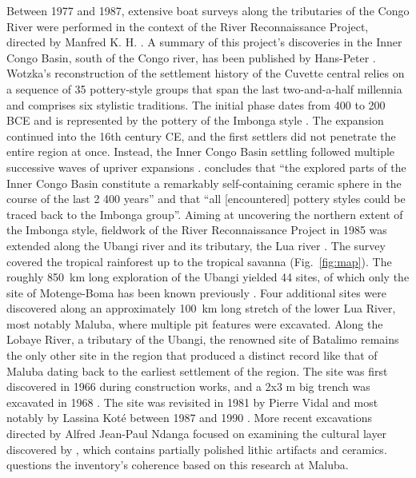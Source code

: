 \documentclass[smallextended,natbib]{svjour3}       %
\begin{document}
Between 1977 and 1987, extensive boat surveys along the tributaries of the Congo River were performed in the context of the River Reconnaissance Project, directed by Manfred K. H. \cite{Eggert.1983,Eggert.1984,Eggert.1993,Eggert.1996}. A summary of this project’s discoveries in the Inner Congo Basin, south of the Congo river, has been published by Hans-Peter \cite{Wotzka.1993}. Wotzka’s reconstruction of the settlement history of the Cuvette central relies on a sequence of 35 pottery-style groups that span the last two-and-a-half millennia and comprises six stylistic traditions. The initial phase dates from 400 to 200 BCE and is represented by the pottery of the Imbonga style \citep[59--68]{Wotzka.1995}. The expansion continued into the 16th century CE, and the first settlers did not penetrate the entire region at once. Instead, the Inner Congo Basin settling followed multiple successive waves of upriver expansions \citep[226-–241]{Wotzka.1995}. \cite[290]{Wotzka.1995} concludes that “the explored parts of the Inner Congo Basin constitute a remarkably self-containing ceramic sphere in the course of the last 2 400 years” and that “all [encountered] pottery styles could be traced back to the Imbonga group”. Aiming at uncovering the northern extent of the Imbonga style, fieldwork of the River Reconnaissance Project in 1985 was extended along the Ubangi river and its tributary, the Lua river \citep{Eggert.1987c}. The survey covered the tropical rainforest up to the tropical savanna (Fig.~\ref{fig:map}). The roughly 850~km long exploration of the Ubangi yielded 44 sites, of which only the site of Motenge-Boma has been known previously \citep[75]{vanNoten.1978,vanNoten.1982a}. Four additional sites were discovered along an approximately 100~km long stretch of the lower Lua River, most notably Maluba, where multiple pit features were excavated. Along the Lobaye River, a tributary of the Ubangi, the renowned site of Batalimo remains the only other site in the region that produced a distinct record like that of Maluba dating back to the earliest settlement of the region. The site was first discovered in 1966 during construction works, and a 2x3 m big trench was excavated in 1968 \citep{deBayledesHermens.1975}. The site was revisited in 1981 by Pierre Vidal and most notably by Lassina Koté between 1987 and 1990 \citep{Kote.1992}. More recent excavations directed by Alfred Jean-Paul Ndanga focused on examining the cultural layer discovered by \cite{deBayledesHermens.1975}, which contains partially polished lithic artifacts and ceramics. \cite[137]{Eggert.1987c} questions the inventory's coherence based on this research at Maluba.
\end{document}
